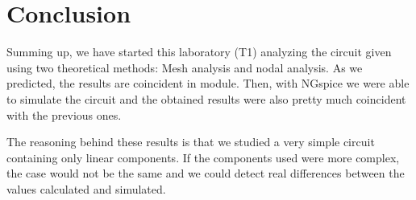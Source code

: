 \section{Conclusion}
\label{sec:conclusion}

Summing up, we have started this laboratory (T1) analyzing the circuit given using two theoretical methods: Mesh analysis and nodal analysis. As we predicted, the results are coincident in module. Then, with NGspice we were able to simulate the circuit and the obtained results were also pretty much coincident with the previous ones. \par
The reasoning behind these results is that we studied a very simple circuit containing only linear components. If the components used were more complex, the case would not be the same and we could detect real differences between the values calculated and simulated.
